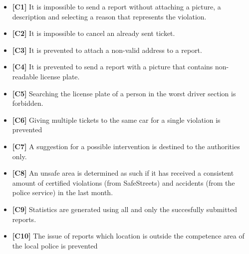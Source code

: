\begin{itemize}
	\item \textbf{[\hypertarget{C1}{C1}]} It is impossible to send a report without attaching a picture, a description and selecting a reason that represents the violation. 
	\item \textbf{[\hypertarget{C2}{C2}]} It is impossible to cancel an already sent ticket. 
	\item \textbf{[\hypertarget{C3}{C3}]} It is prevented to attach a non-valid address to a report.
	\item \textbf{[\hypertarget{C4}{C4}]} It is prevented to send a report with a picture that contains non-readable license plate. 
	\item \textbf{[\hypertarget{C5}{C5}]} Searching the license plate of a person in the worst driver section is forbidden.
	\item \textbf{[\hypertarget{C6}{C6}]} Giving multiple tickets to the same car for a single violation is prevented
	\item \textbf{[\hypertarget{C7}{C7}]} A suggestion for a possible intervention is destined to the authorities only.
	\item \textbf{[\hypertarget{C8}{C8}]} An unsafe area is determined as such if it has received a consistent amount of certified violations (from SafeStreets) and accidents (from the police service) in the last month. 
	\item \textbf{[\hypertarget{C9}{C9}]} Statistics are generated using all and only the succesfully submitted reports.
	\item \textbf{[\hypertarget{C10}{C10}]} The issue of reports which location is outside the competence area of the local police is prevented
	
\end{itemize}
\clearpage
